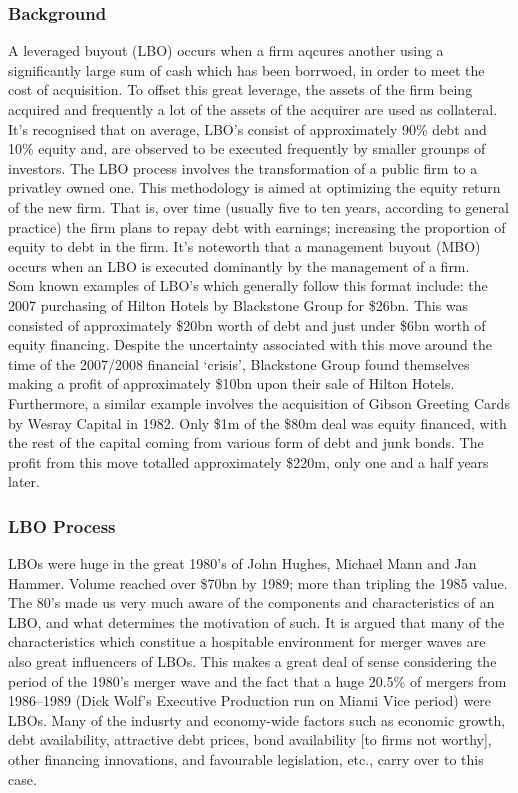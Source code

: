 \documentclass[11pt, english]{article}
\begin{document}
		\subsubsection*{Background}

	A leveraged buyout (LBO) occurs when a firm aqcures another using a significantly large sum of cash which has been borrwoed, in order to meet the cost of acquisition. To offset this great leverage, the assets of the firm being acquired and frequently a lot of the assets of the acquirer are used as collateral. It's recognised that on average, LBO's consist of approximately 90\% debt and 10\% equity and, are observed to be executed frequently by smaller grounps of investors. The LBO process involves the transformation of a public firm to a privatley owned one. This methodology is aimed at optimizing the equity return of the new firm. That is, over time (usually five to ten years, according to general practice) the firm plans to repay debt with earnings; increasing the proportion of equity to debt in the firm. It's noteworth that a management buyout (MBO) occurs when an LBO is executed dominantly by the management of a firm.\\

	Som known examples of LBO's which generally follow this format include: the 2007 purchasing of Hilton Hotels by Blackstone Group for \$26bn. This was consisted of approximately \$20bn worth of debt and just under \$6bn worth of equity financing. Despite the uncertainty associated with this move around the time of the 2007/2008 financial `crisis', Blackstone Group found themselves making a profit of approximately \$10bn upon their sale of Hilton Hotels. Furthermore, a similar example involves the acquisition of Gibson Greeting Cards by Wesray Capital in 1982. Only \$1m of the \$80m deal was equity financed, with the rest of the capital coming from various form of debt and junk bonds. The profit from this move totalled approximately \$220m, only one and a half years later.

		\subsubsection*{LBO Process}

	LBOs were huge in the great 1980's of John Hughes, Michael Mann and Jan Hammer. Volume reached over \$70bn by 1989; more than tripling the 1985 value. The 80's made us very much aware of the components and characteristics of an LBO, and what determines the motivation of such. It is argued that many of the characteristics which constitue a hospitable environment for merger waves are also great influencers of LBOs. This makes a great deal of sense considering the period of the 1980's merger wave and the fact that a huge 20.5\% of mergers from 1986--1989 (Dick Wolf's Executive Production run on Miami Vice period) were LBOs. Many of the indusrty and economy-wide factors such as economic growth, debt availability, attractive debt prices, bond availability [to firms not worthy], other financing innovations, and favourable legislation, etc., carry over to this case.\\
\end{document}
